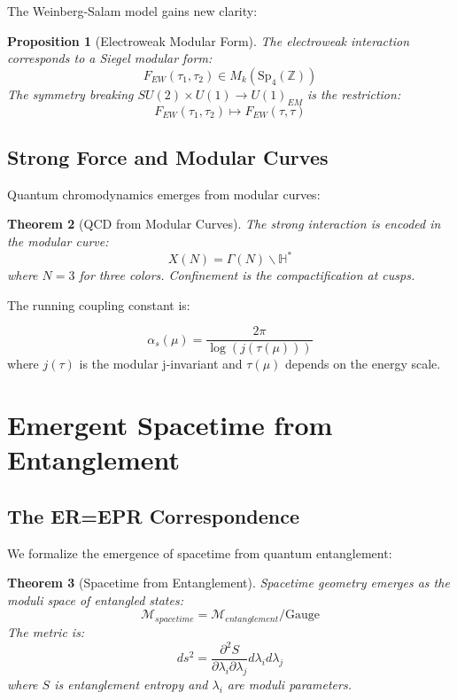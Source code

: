 \documentclass[12pt,a4paper]{article}
\newtheorem{theorem}{Theorem}[section]
\newtheorem{proposition}[theorem]{Proposition}
\begin{document}
The Weinberg-Salam model gains new clarity:

\begin{proposition}[Electroweak Modular Form]
The electroweak interaction corresponds to a Siegel modular form:
\[
F_{EW}(\tau_1, \tau_2) \in M_k(\text{Sp}_4(\mathbb{Z}))
\]
The symmetry breaking $SU(2) \times U(1) \to U(1)_{EM}$ is the restriction:
\[
F_{EW}(\tau_1, \tau_2) \mapsto F_{EW}(\tau, \tau)
\]
\end{proposition}

\subsection{Strong Force and Modular Curves}

Quantum chromodynamics emerges from modular curves:

\begin{theorem}[QCD from Modular Curves]
The strong interaction is encoded in the modular curve:
\[
X(N) = \Gamma(N) \backslash \mathbb{H}^*
\]
where $N = 3$ for three colors. Confinement is the compactification at cusps.
\end{theorem}

The running coupling constant is:

\begin{equation}
\alpha_s(\mu) = \frac{2\pi}{\log(j(\tau(\mu)))}
\end{equation}
where $j(\tau)$ is the modular j-invariant and $\tau(\mu)$ depends on the energy scale.

\section{Emergent Spacetime from Entanglement}

\subsection{The ER=EPR Correspondence}

We formalize the emergence of spacetime from quantum entanglement:

\begin{theorem}[Spacetime from Entanglement]
Spacetime geometry emerges as the moduli space of entangled states:
\[
\mathcal{M}_{spacetime} = \mathcal{M}_{entanglement} / \text{Gauge}
\]
The metric is:
\[
ds^2 = \frac{\partial^2 S}{\partial \lambda_i \partial \lambda_j} d\lambda_i d\lambda_j
\]
where $S$ is entanglement entropy and $\lambda_i$ are moduli parameters.
\end{theorem}
\end{document}
